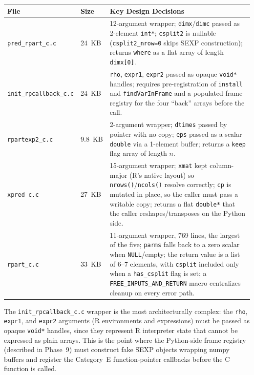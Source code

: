 \documentclass[12pt]{article}
\begin{document}
\medskip
\begin{center}
\begin{tabular}{lp{1.6cm}p{8cm}}
\toprule
File & Size & Key Design Decisions \\
\midrule
\texttt{pred\_rpart\_c.c} & 24~KB & 12-argument wrapper; \texttt{dimx}/\texttt{dimc} passed as 2-element \texttt{int*}; \texttt{csplit2} is nullable (\texttt{csplit2\_nrow=0} skips SEXP construction); returns \texttt{where} as a flat array of length \texttt{dimx[0]}. \\
\texttt{init\_rpcallback\_c.c} & 24~KB & \texttt{rho}, \texttt{expr1}, \texttt{expr2} passed as opaque \texttt{void*} handles; requires pre-registration of \texttt{install} and \texttt{findVarInFrame} and a populated frame registry for the four ``back'' arrays before the call. \\
\texttt{rpartexp2\_c.c} & 9.8~KB & 2-argument wrapper; \texttt{dtimes} passed by pointer with no copy; \texttt{eps} passed as a scalar \texttt{double} via a 1-element buffer; returns a \texttt{keep} flag array of length $n$. \\
\texttt{xpred\_c.c} & 27~KB & 15-argument wrapper; \texttt{xmat} kept column-major (R's native layout) so \texttt{nrows()}/\texttt{ncols()} resolve correctly; \texttt{cp} is mutated in place, so the caller must pass a writable copy; returns a flat \texttt{double*} that the caller reshapes/transposes on the Python side. \\
\texttt{rpart\_c.c} & 33~KB & 11-argument wrapper, 769 lines, the largest of the five; \texttt{parms} falls back to a zero scalar when \texttt{NULL}/empty; the return value is a list of 6--7 elements, with \texttt{csplit} included only when a \texttt{has\_csplit} flag is set; a \texttt{FREE\_INPUTS\_AND\_RETURN} macro centralizes cleanup on every error path. \\
\bottomrule
\end{tabular}
\end{center}
\medskip

The \texttt{init\_rpcallback\_c.c} wrapper is the most architecturally complex: the \texttt{rho}, \texttt{expr1}, and \texttt{expr2} arguments (R environments and expressions) must be passed as opaque \texttt{void*} handles, since they represent R interpreter state that cannot be expressed as plain arrays. This is the point where the Python-side frame registry (described in Phase~9) must construct fake SEXP objects wrapping numpy buffers and register the Category~E function-pointer callbacks before the C function is called.
\end{document}
